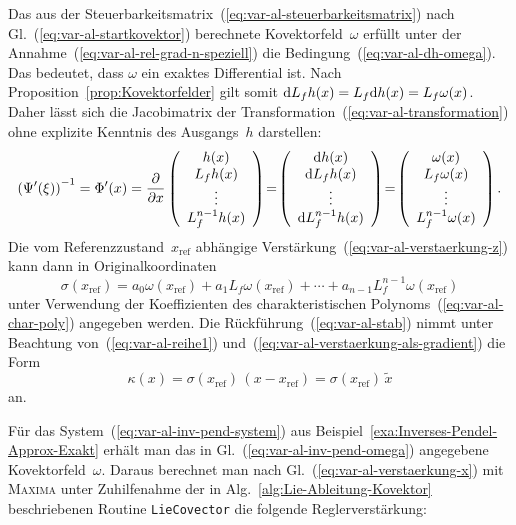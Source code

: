 Das aus der Steuerbarkeitsmatrix~(\ref{eq:var-al-steuerbarkeitsmatrix})
nach Gl.~(\ref{eq:var-al-startkovektor}) berechnete Kovektorfeld~$\omega$
erfüllt unter der Annahme~(\ref{eq:var-al-rel-grad-n-speziell})
die Bedingung~(\ref{eq:var-al-dh-omega}). Das bedeutet, dass $\omega$
ein exaktes Differential ist. Nach Proposition~\ref{prop:Kovektorfelder}
gilt somit ${\mathrm{d}} L_{f}h(x)=L_{f}{\mathrm{d}} h(x)=L_{f}\omega(x)$. Daher lässt
sich die Jacobimatrix der Transformation~(\ref{eq:var-al-transformation})
ohne explizite Kenntnis des Ausgangs~$h$ darstellen:
\[
\left(\Psi^{\prime}(\xi)\right)^{-1}=\Phi^{\prime}(x)=\frac{\partial}{\partial x}\left(\begin{array}{c}
h(x)\\
L_{f}h(x)\\
\vdots\\
L_{f}^{n-1}h(x)
\end{array}\right)\!=\!\left(\begin{array}{c}
{\mathrm{d}} h(x)\\
{\mathrm{d}} L_{f}h(x)\\
\vdots\\
{\mathrm{d}} L_{f}^{n-1}h(x)
\end{array}\right)\!=\!\left(\begin{array}{c}
\omega(x)\\
L_{f}\omega(x)\\
\vdots\\
L_{f}^{n-1}\omega(x)
\end{array}\right).
\]
Die vom Referenzzustand~$x_{\text{ref}}$ abhängige Verstärkung~(\ref{eq:var-al-verstaerkung-z})
kann dann in Originalkoordinaten 
\begin{equation}
\sigma(x_{\text{ref}})=a_{0}\omega(x_{\text{ref}})+a_{1}L_{f}\omega(x_{\text{ref}})+\cdots+a_{n-1}L_{f}^{n-1}\omega(x_{\text{ref}})\label{eq:var-al-verstaerkung-x}
\end{equation}
unter Verwendung der Koeffizienten des charakteristischen Polynoms~(\ref{eq:var-al-char-poly})
angegeben werden. Die Rückführung~(\ref{eq:var-al-stab}) nimmt unter
Beachtung von~(\ref{eq:var-al-reihe1}) und~(\ref{eq:var-al-verstaerkung-als-gradient})
die Form 
\[
\kappa(x)=\sigma(x_{\text{ref}})\,(x-x_{\text{ref}})=\sigma(x_{\text{ref}})\,\tilde{x}
\]
an.

\begin{example}
\label{exa:Inverses-Pendel-Approx-0}Für das System~(\ref{eq:var-al-inv-pend-system})
aus Beispiel~\ref{exa:Inverses-Pendel-Approx-Exakt} erhält man das
in Gl.~(\ref{eq:var-al-inv-pend-omega}) angegebene Kovektorfeld~$\omega$.
Daraus berechnet man nach Gl.~(\ref{eq:var-al-verstaerkung-x}) mit
\textsc{Maxima} unter Zuhilfenahme der in Alg.~\ref{alg:Lie-Ableitung-Kovektor}
beschriebenen Routine \texttt{LieCovector} die folgende Reglerverstärkung:

\begin{maxima}\end{maxima}
\end{example}

